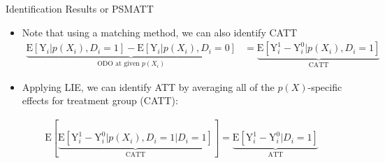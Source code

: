 \documentclass[hyperref={pdfpagelabels=false}]{beamer}
\begin{document}
\begin{frame}{Identification Results or PSM}{ATT}
	\begin{itemize}
		
		\item Note that using a matching method, we can also identify CATT
		\vspace{0.2cm}
		\begin{equation*}
			\begin{aligned}
				\underbrace{\mathrm{E}[\mathrm{Y}_{i}|p(X_{i}),D_{i}=1] - \mathrm{E}[\mathrm{Y}_{i}|p(X_{i}),D_{i}=0]}_{\text{ODO at given $p(X_{i})$}} &= \underbrace{\mathrm{E}[\mathrm{Y}^{1}_{i}-\mathrm{Y}^{0}_{i}|p(X_{i}),D_i=1]}_{\text{CATT}}
			\end{aligned}
		\end{equation*}	
		
		
		\item Applying LIE, we can identify ATT by averaging all of the $p(X)$-specific effects for treatment group (CATT):
		\vspace{0.2cm}
		
	\end{itemize}
	\begin{equation*}
		\begin{aligned}
			\mathrm{E}[\underbrace{\mathrm{E}[\mathrm{Y}^{1}_{i}-\mathrm{Y}^{0}_{i}|p(X_{i}),D_i=1 |D_i=1]}_{\text{CATT}}] 
			=\underbrace{\mathrm{E}[\mathrm{Y}^{1}_{i}-\mathrm{Y}^{0}_{i}|D_i=1]}_{\text{ATT}}
			
		\end{aligned}
	\end{equation*}	
	
\end{frame}
\end{document}
